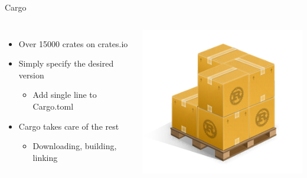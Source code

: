 \documentclass{beamer}
\begin{document}
    \begin{frame}{Cargo}
        \begin{columns}
            \large{
                \begin{itemize}
                    \item Over 15000 crates on crates.io
                    \item Simply specify the desired version
                    \begin{itemize}
                        \item Add single line to Cargo.toml
                    \end{itemize}
                    \item Cargo takes care of the rest
                    \begin{itemize}
                        \item Downloading, building, linking
                    \end{itemize}
                \end{itemize}
            }
            \includegraphics[width=\textwidth]{cargo-logo}
        \end{columns}
    \end{frame}
\end{document}
